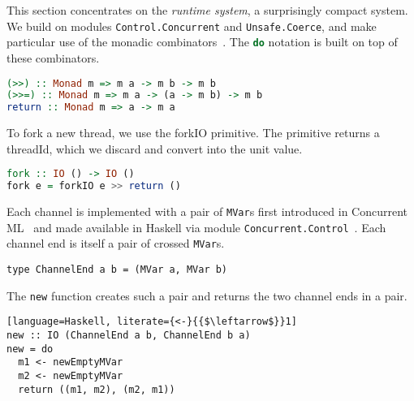 %
This section concentrates on the \emph{runtime system}, a surprisingly
compact system. We build on modules \lstinline|Control.Concurrent| and
\lstinline|Unsafe.Coerce|, and make particular use of the monadic
combinators~\cite{DBLP:conf/afp/Wadler95}. The
\lstinline[language=Haskell]|do| notation is built on top of these
combinators.
%
\begin{lstlisting}[language=Haskell]
(>>) :: Monad m => m a -> m b -> m b
(>>=) :: Monad m => m a -> (a -> m b) -> m b
return :: Monad m => a -> m a
\end{lstlisting}

To fork a new thread, we use the forkIO primitive. The primitive
returns a threadId, which we discard and convert into the unit value.
%
\begin{lstlisting}[language=Haskell]
fork :: IO () -> IO ()
fork e = forkIO e >> return ()
\end{lstlisting}

Each channel is implemented with a pair of \lstinline|MVar|s first
introduced in Concurrent ML~\cite{DBLP:conf/mcmaster/Reppy93} and made
available in Haskell via module
\lstinline|Concurrent.Control|~\cite{DBLP:conf/popl/JonesGF96}. Each
channel end is itself a pair of crossed \lstinline|MVar|s.
%
\begin{lstlisting}
type ChannelEnd a b = (MVar a, MVar b)
\end{lstlisting}

The \lstinline|new| function creates such a pair and returns the two
channel ends in a pair.
%
\begin{lstlisting}[language=Haskell, literate={<-}{{$\leftarrow$}}1]
new :: IO (ChannelEnd a b, ChannelEnd b a)
new = do
  m1 <- newEmptyMVar
  m2 <- newEmptyMVar
  return ((m1, m2), (m2, m1))
\end{lstlisting}

